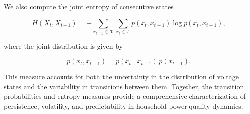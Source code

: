 \documentclass[review]{elsarticle}
\begin{document}
We also compute the joint entropy of consecutive states

\[
H(X_t, X_{t-1}) =
- \sum_{x_{t-1} \in \mathcal{X}}
\sum_{x_t \in \mathcal{X}}
p(x_t, x_{t-1}) \log p(x_t, x_{t-1}),
\]

where the joint distribution is given by

\[
p(x_t, x_{t-1}) =
p(x_t \mid x_{t-1}) \, p(x_{t-1}).
\]

This measure accounts for both the uncertainty in the distribution of voltage states and the variability in transitions between them. Together, the transition probabilities and entropy measures provide a comprehensive characterization of persistence, volatility, and predictability in household power quality dynamics.

\end{document}
